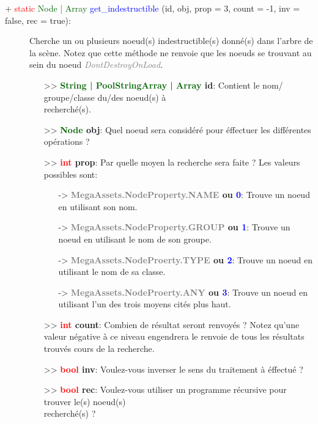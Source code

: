 \documentclass[a4paper, 11pt]{article}
\begin{document}
	\begin{description}
		\item [+ \textcolor{red}{static} \textcolor{darkgreen}{Node | Array} \textcolor{blue}
		{get\_indestructible} (id, obj, prop = 3, count = -1, inv = false, rec = true):] Cherche un ou 
		plusieurs noeud(s) indestructible(s) donné(s) dans l'arbre de la scène. Notez que cette méthode ne
		renvoie que les noeuds se trouvant au sein du noeud \textit{\textcolor{gray}{DontDestroyOnLoad}}.
		\begin{itemize}
			\item [>> \textbf{\textcolor{darkgreen}{String | PoolStringArray | Array} id}:] Contient le nom/
			groupe/classe du/des noeud(s) à \\recherché(s).
			\item [>> \textbf{\textcolor{darkgreen}{Node} obj}:] Quel noeud sera considéré pour éffectuer 
			les différentes opérations ?
			\item [>> \textbf{\textcolor{red}{int} prop}:] Par quelle moyen la recherche sera faite ? Les 
			valeurs possibles sont:
			\begin{itemize}
				\item [-> \textbf{\textcolor{gray}{MegaAssets.NodeProperty.NAME} ou \textcolor{blue}{0}}:] 
				Trouve un noeud en utilisant son nom.
				\item [-> \textbf{\textcolor{gray}{MegaAssets.NodeProperty.GROUP} ou \textcolor{blue}{1}}:] 
				Trouve un noeud en utilisant le nom de son groupe.
				\item [-> \textbf{\textcolor{gray}{MegaAssets.NodeProerty.TYPE} ou \textcolor{blue}{2}}:] 
				Trouve un noeud en utilisant le nom de sa classe.
				\item [-> \textbf{\textcolor{gray}{MegaAssets.NodeProerty.ANY} ou \textcolor{blue}{3}}:] 
				Trouve un noeud en utilisant l'un des trois moyens cités plus haut.
			\end{itemize}
			\item [>> \textbf{\textcolor{red}{int} count}:] Combien de résultat seront renvoyés ? Notez 
			qu'une valeur négative à ce niveau engendrera le renvoie de tous les résultats trouvés cours de 
			la recherche.
			\item [>> \textbf{\textcolor{red}{bool} inv}:] Voulez-vous inverser le sens du traitement à 
			éffectué ?
			\item [>> \textbf{\textcolor{red}{bool} rec}:] Voulez-vous utiliser un programme récursive pour 
			trouver le(s) noeud(s) \\recherché(s) ?\\
		\end{itemize}
	\end{description}
\end{document}

